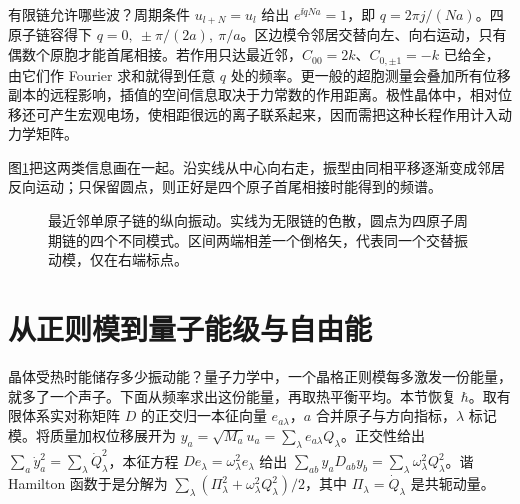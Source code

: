 有限链允许哪些波？周期条件 $u_{l+N}=u_l$ 给出 $e^{\ii qNa}=1$，即 $q=2\pi j/(Na)$。四原子链容得下 $q=0,\ \pm\pi/(2a),\ \pi/a$。区边模令邻居交替向左、向右运动，只有偶数个原胞才能首尾相接。若作用只达最近邻，$C_{00}=2k$、$C_{0,\pm1}=-k$ 已给全，由它们作 Fourier 求和就得到任意 $q$ 处的频率。更一般的超胞测量会叠加所有位移副本的远程影响，插值的空间信息取决于力常数的作用距离。极性晶体中，相对位移还可产生宏观电场，使相距很远的离子联系起来，因而需把这种长程作用计入动力学矩阵。

图\ref{phonon:chain-plot}把这两类信息画在一起。沿实线从中心向右走，振型由同相平移逐渐变成邻居反向运动；只保留圆点，则正好是四个原子首尾相接时能得到的频谱。
\begin{figure}[htbp]
\centering
{}
\caption{最近邻单原子链的纵向振动。实线为无限链的色散，圆点为四原子周期链的四个不同模式。区间两端相差一个倒格矢，代表同一个交替振动模，仅在右端标点。}
\label{phonon:chain-plot}
\end{figure}

\section{从正则模到量子能级与自由能}
晶体受热时能储存多少振动能？量子力学中，一个晶格正则模每多激发一份能量，就多了一个声子。下面从频率求出这份能量，再取热平衡平均。本节恢复 $\hbar$。取有限体系实对称矩阵 $D$ 的正交归一本征向量 $e_{a\lambda}$，$a$ 合并原子与方向指标，$\lambda$ 标记模。将质量加权位移展开为 $y_a=\sqrt{M_a}u_a=\sum_\lambda e_{a\lambda}Q_\lambda$。正交性给出 $\sum_a\dot y_a^2=\sum_\lambda\dot Q_\lambda^2$，本征方程 $De_\lambda=\omega_\lambda^2e_\lambda$ 给出 $\sum_{ab}y_aD_{ab}y_b=\sum_\lambda\omega_\lambda^2Q_\lambda^2$。谐 Hamilton 函数于是分解为 $\sum_\lambda(\Pi_\lambda^2+\omega_\lambda^2Q_\lambda^2)/2$，其中 $\Pi_\lambda=\dot Q_\lambda$ 是共轭动量。

